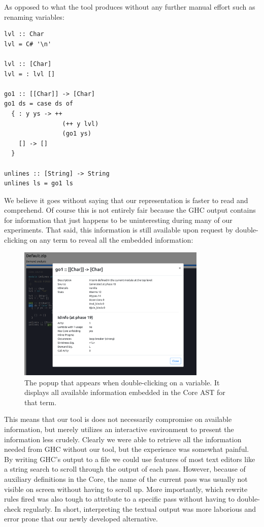 As opposed to what the tool produces without any further manual effort such as renaming variables:

\begin{listing}[H]
\begin{verbatim}
lvl :: Char
lvl = C# '\n'

lvl :: [Char]
lvl = : lvl []

go1 :: [[Char]] -> [Char]
go1 ds = case ds of
  { : y ys -> ++
                (++ y lvl)
                (go1 ys)
    [] -> []
  }

unlines :: [String] -> String
unlines ls = go1 ls
\end{verbatim}
\end{listing}

We believe it goes without saying that our representation is faster to read and comprehend. Of course this is not entirely
fair because the GHC output contains for information that just happens to be uninteresting during many of our experiments.
That said, this information is still available upon request by double-clicking on any term to reveal all the embedded information:

\begin{figure}[H]
\centering
\includegraphics[width=0.8\textwidth]{figs/var_popup.png}
\caption{The popup that appears when double-clicking on a variable. It displays all available information embedded in the Core AST for that term.}
\label{fig:var-popup}
\end{figure}

This means that our tool is does not necessarily compromise on available information, but merely utilizes an interactive environment
to present the information less crudely. Clearly we were able to retrieve all the information needed from GHC without our tool, 
but the experience was somewhat painful.
By writing GHC's output to a file we could use features of most text editors like a string search to scroll through
the output of each pass. However, because of auxiliary definitions in the Core, the name of the current pass was usually not visible on
screen without having to scroll up. More importantly, which rewrite rules fired was also tough to attribute to a specific pass without
having to double-check regularly. In short, interpreting the textual output was more laborious and error prone that our newly developed
alternative.

